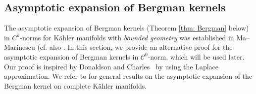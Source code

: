 \documentclass[a4paper, 11pt]{amsart}
\theoremstyle{plain}
\numberwithin{equation}{section} %
\numberwithin{figure}{section} %
\theoremstyle{plain}
\theoremstyle{plain}
\theoremstyle{plain}
\theoremstyle{plain}
\theoremstyle{remark}
\theoremstyle{definition}
\theoremstyle{definition}
\begin{document}
\subsection{Asymptotic expansion of  Bergman kernels}
The asymptotic expansion of Bergman kernels (Theorem \ref{thm: Bergman} below) in $C^k$-norms  for Kähler manifolds with {\it bounded geometry} was established in 
Ma–Marinescu \cite[Problem 6.1]{MaMarinescu-book} (cf. also  \cite[Theorem 6]{Ma_Marinescu_2015}.  In this section,  we provide an alternative proof for the asymptotic expansion of Bergman kernels in $\mathcal{C}^0$-norm, which will be used later. Our proof is inspired by Donaldson \cite{donaldson-2009-notes} and  Charles~\cite{charles15-bergmankernel} by using the Laplace approximation. We refer to \cite[Section 6]{MaMarinescu-book} for general results on the asymptotic expansion of the Bergman kernel on complete K\"ahler manifolds.
\end{document}

